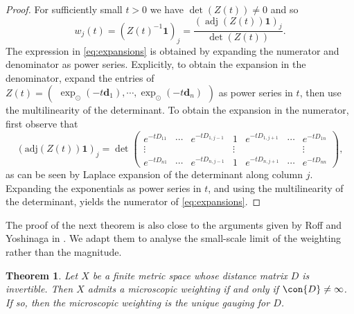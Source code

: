 \documentclass[a4paper, oneside, reqno]{amsart}
\newtheorem{theorem}{Theorem}[section]
\theoremstyle{definition}
\theoremstyle{remark}
\numberwithin{equation}{section}
\DeclareMathOperator{\adj}{adj}
\renewcommand{\vec}{\mathbf}
\newcommand{\onevector}{\mathbf{1}}
\begin{document}
\begin{proof}
For sufficiently small \(t > 0\) we have \(\det(Z(t)) \neq 0\) and so
\[
{w}_j(t) = (Z(t)^{-1} \onevector)_j = \frac{(\adj(Z(t)) \onevector)_j}{\det(Z(t))}.
\]
The expression in \eqref{eq:expansions} is obtained by expanding the numerator and denominator as power series. Explicitly, to obtain the expansion in the denominator, expand the entries of \(Z(t) = \begin{pmatrix} \exp_{\odot}(-t\vec{d}_1), \cdots, \exp_{\odot}(-t\vec{d}_n)\end{pmatrix}\) as power series in \(t\), then use the multilinearity of the determinant. To obtain the expansion in the numerator, first observe that
\begin{equation}
\label{eq:adj1_det}
(\mathrm{adj}(Z(t)) \onevector)_j = \det
\begin{pmatrix}
e^{-tD_{11}} & \cdots & e^{-tD_{1,j-1}} & 1 & e^{-tD_{1,j+1}} & \cdots & e^{-tD_{1n}} \\
\vdots& & &\vdots& & &\vdots\\
e^{-tD_{n1}} & \cdots & e^{-tD_{n,j-1}}  & 1 & e^{-tD_{n,j+1}}  & \cdots& e^{-tD_{nn}} 
\end{pmatrix},
\end{equation}
as can be seen by Laplace expansion of the determinant along column \(j\).
Expanding the exponentials as power series in \(t\), and using the multilinearity of the determinant, yields the numerator of \eqref{eq:expansions}.
\end{proof}

The proof of the next theorem is also close to the arguments given by Roff and Yoshinaga in \cite[Theorem~2.3]{RoffYoshinaga}. We adapt them to analyse the small-scale limit of the weighting rather than the magnitude.

\begin{theorem}
\label{thm:microwtg_D_invertible}
    Let \(X\) be a finite metric space whose distance matrix \(D\) is invertible. Then \(X\) admits a microscopic weighting if and only if \(\con{D} \neq \infty\). If so, then the microscopic weighting is the unique gauging for \(D\).
\end{theorem}
\end{document}
